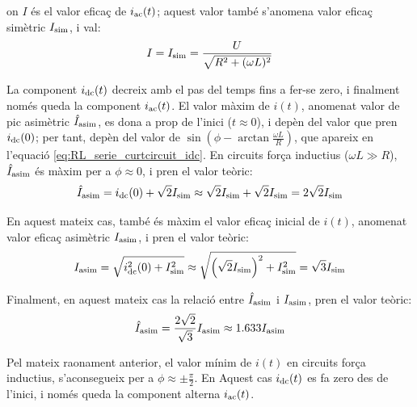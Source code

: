 on $I$ és el valor eficaç de $i_\mathrm{ac}(t)$; aquest valor també s'anomena valor eficaç simètric $I_\mathrm{sim}$, i val:
\begin{equation}
    I = I_\mathrm{sim} =\frac{U}{\sqrt{R^2+(\omega L)^2}}
    \label{eq:RL_serie_curtcircuit_I}
\end{equation}

La component $i_\mathrm{dc}(t)$ decreix amb el pas del temps fins a fer-se zero, i finalment només queda la component $i_\mathrm{ac}(t)$. El valor màxim de $i(t)$, anomenat valor de pic asimètric $\hat{I}_\mathrm{asim}$, es dona a prop de l'inici ($t\approx 0$), i depèn del valor que pren $i_\mathrm{dc}(0)$;  per tant, depèn del valor de $\sin\left(\phi - \arctan\frac{\omega L}{R}\right)$, que apareix en l'equació \eqref{eq:RL_serie_curtcircuit_idc}. En circuits força inductius ($\omega L\gg R$), $\hat{I}_\mathrm{asim}$ és màxim per a $\phi \approx 0$, i pren el valor teòric:
\begin{equation}
    \hat{I}_\mathrm{asim} = i_\mathrm{dc}(0) + \sqrt{2} I_\mathrm{sim} \approx \sqrt{2} I_\mathrm{sim} +\sqrt{2} I_\mathrm{sim} =2 \sqrt{2} I_\mathrm{sim}    \label{eq:I_asim_pic}
\end{equation}


En aquest mateix cas, també és màxim el valor eficaç inicial de $i(t)$, anomenat valor eficaç asimètric $I_\mathrm{asim}$,  i pren el valor teòric:
\begin{equation}
    I_\mathrm{asim} = \sqrt{i_\mathrm{dc}^2(0) + I_\mathrm{sim}^2} \approx \sqrt{\left(\sqrt{2}I_\mathrm{sim}\right)^2 + I_\mathrm{sim}^2} = \sqrt{3} I_\mathrm{sim} \label{eq:I_asim_eff}
\end{equation}

Finalment, en aquest mateix cas la relació entre $\hat{I}_\mathrm{asim}$ i $I_\mathrm{asim}$,   pren el valor teòric:
\begin{equation}
    \hat{I}_\mathrm{asim} = \frac{2\sqrt{2}}{\sqrt{3}} I_\mathrm{asim} \approx
    \num{1,633} I_\mathrm{asim}
\end{equation}

Pel mateix raonament anterior, el valor mínim de $i(t)$ en circuits força inductius, s'aconsegueix per a $\phi \approx \pm\frac{\pi}{2}$. En Aquest cas $i_\mathrm{dc}(t)$ es fa zero des de l'inici, i només queda la component alterna $i_\mathrm{ac}(t)$.


